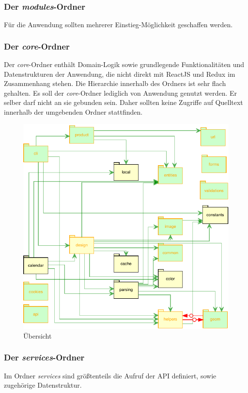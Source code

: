 \subsubsection{Der \textit{modules}-Ordner}
Für die Anwendung sollten mehrerer Einstieg-Möglichkeit geschaffen werden. 

\subsubsection{Der \textit{core}-Ordner}
Der \textit{core}-Ordner enthält Domain-Logik sowie grundlegende Funktionalitäten und Datenstrukturen der Anwendung, die nicht direkt mit ReactJS und Redux im Zusammenhang stehen. 
Die Hierarchie innerhalb des Ordners ist sehr flach gehalten.  
Es soll der \textit{core}-Ordner lediglich von Anwendung genutzt werden. Er selber darf nicht an sie gebunden sein.  Daher sollten keine Zugriffe auf Quelltext innerhalb der umgebenden Ordner stattfinden. 


\begin{figure}[H]
	\centering
	\includegraphics{diagrams/Ist-Architektur/core-graph.pdf}
	\caption{Übersicht  }
	\label{fig:coreGraph}
\end{figure}

\subsubsection{Der \textit{services}-Ordner}
Im Ordner \textit{services} sind größtenteils die Aufruf der API definiert, sowie zugehörige Datenstruktur. 

